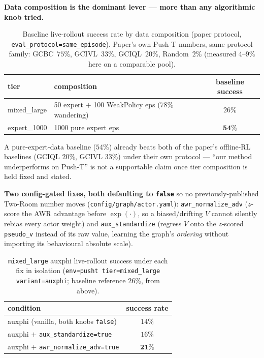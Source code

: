 \documentclass[11pt]{article}
\begin{document}
\textbf{Data composition is the dominant lever --- more than any algorithmic knob tried.}

\begin{table}[h]
\centering
\small
\caption{Baseline live-rollout success rate by data composition (paper protocol,
\texttt{eval\_protocol=same\_episode}). Paper's own Push-T numbers, same protocol family:
GCBC~$75\%$, GCIVL~$33\%$, GCIQL~$20\%$, Random~$2\%$ (measured $4$--$9\%$ here on a comparable
pool).}
\begin{tabular}{llc}
\toprule
tier & composition & baseline success \\
\midrule
mixed\_large & 50 expert $+$ 100 WeakPolicy eps ($78\%$ wandering) & $26\%$ \\
expert\_1000 & 1000 pure expert eps & $\mathbf{54\%}$ \\
\bottomrule
\end{tabular}
\end{table}

A pure-expert-data baseline ($54\%$) already beats both of the paper's offline-RL baselines
(GCIQL $20\%$, GCIVL $33\%$) under their own protocol --- ``our method underperforms on
Push-T'' is not a supportable claim once tier composition is held fixed and stated.

\textbf{Two config-gated fixes, both defaulting to \texttt{false}} so no previously-published
Two-Room number moves (\texttt{config/graph/actor.yaml}): \texttt{awr\_normalize\_adv}
($z$-score the AWR advantage before $\exp(\cdot)$, so a biased/drifting $V$ cannot silently
rebias every actor weight) and \texttt{aux\_standardize} (regress $V$ onto the $z$-scored
\texttt{pseudo\_v} instead of its raw value, learning the graph's \emph{ordering} without
importing its behavioural absolute scale).

\begin{table}[h]
\centering
\small
\caption{\texttt{mixed\_large} auxphi live-rollout success under each fix in isolation
(\texttt{env=pusht tier=mixed\_large variant=auxphi}; baseline reference $26\%$, from above).}
\begin{tabular}{lc}
\toprule
condition & success rate \\
\midrule
auxphi (vanilla, both knobs \texttt{false}) & $14\%$ \\
auxphi $+$ \texttt{aux\_standardize=true} & $16\%$ \\
auxphi $+$ \texttt{awr\_normalize\_adv=true} & $\mathbf{21\%}$ \\
\bottomrule
\end{tabular}
\end{table}
\end{document}
